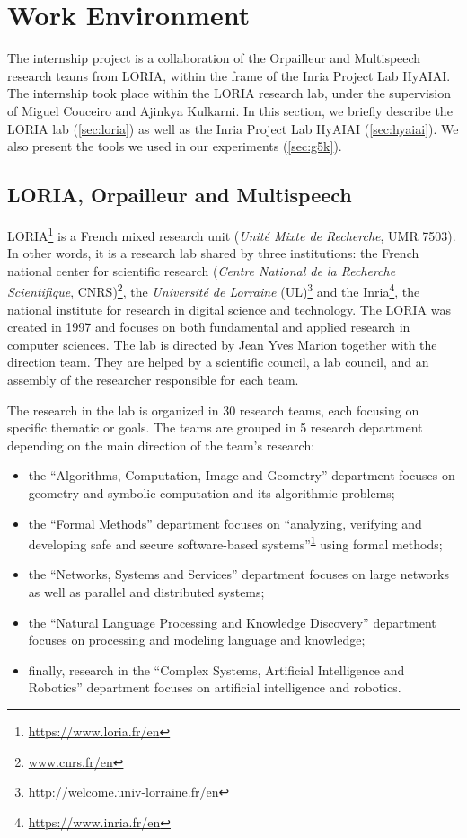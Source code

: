 \section{Work Environment\label{sec:lab}}
The internship project is a collaboration of the Orpailleur and Multispeech research teams from LORIA, within the frame of the Inria Project Lab HyAIAI. The internship took place within the LORIA research lab, under the supervision of Miguel Couceiro and Ajinkya Kulkarni.
In this section, we briefly describe the LORIA lab (\cref{sec:loria}) as well as the Inria Project Lab HyAIAI (\cref{sec:hyaiai}).
We also present the tools we used in our experiments (\cref{sec:g5k}).

\subsection{LORIA, Orpailleur and Multispeech\label{sec:loria}}
LORIA\footnote{\url{https://www.loria.fr/en}\label{fn:loria}} is a French mixed research unit (\textit{Unité Mixte de Recherche}, UMR 7503).
In other words, it is a research lab shared by three institutions: the French national center for scientific research (\textit{Centre National de la Recherche Scientifique}, CNRS)\footnote{\url{www.cnrs.fr/en}}, the \textit{Universit\'{e} de Lorraine} (UL)\footnote{\url{http://welcome.univ-lorraine.fr/en}} and the Inria\footnote{\url{https://www.inria.fr/en}}, the national institute for research in digital science and technology.
The LORIA was created in 1997 and focuses on both fundamental and applied research in computer sciences.
The lab is directed by Jean Yves Marion together with the direction team. They are helped by a scientific council, a lab council, and an assembly of the researcher responsible for each team.

The research in the lab is organized in 30 research teams, each focusing on specific thematic or goals.
The teams are grouped in 5 research department depending on the main direction of the team's research:
\begin{itemize}
    \item the ``Algorithms, Computation, Image and Geometry'' department focuses on geometry and symbolic computation and its algorithmic problems;
    \item the ``Formal Methods'' department focuses on ``analyzing, verifying and developing safe and secure software-based systems''\textsuperscript{\ref{fn:loria}} using formal methods;
    \item the ``Networks, Systems and Services'' department focuses on large networks as well as parallel and distributed systems;
    \item the ``Natural Language Processing and Knowledge Discovery'' department focuses on processing and modeling language and knowledge;
    \item finally, research in the ``Complex Systems, Artificial Intelligence and Robotics'' department focuses on artificial intelligence and robotics.
\end{itemize}

